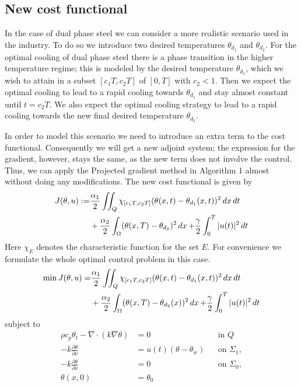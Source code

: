 \subsection{New cost functional}\label{sec:new-cost-func}

In the case of dual phase steel we can consider a more realistic scenario used in the industry. To do so we introduce two desired temperatures $\theta_{d_1}$ and $\theta_{d_2}$. For the optimal cooling of dual phase steel there is a phase transition in the higher temperature regime; this is modeled by the desired temperature $\theta_{d_1}$, which we wish to attain in a subset $[c_1T, c_2T]$ of $[0,T]$ with $c_2 < 1$. Then we expect the optimal cooling to lead to a rapid cooling towards $\theta_{d_1}$ and stay almost constant until $t=c_2T$. We also expect the optimal cooling strategy to lead to a rapid cooling towards the new final desired temperature $\theta_{d_2}$.

In order to model this scenario we need to introduce an extra term to the cost functional. Consequently we will get a new adjoint system; the expression for the gradient, however, stays the same, as the new term does not involve the control. Thus, we can apply the Projected gradient method in Algorithm 1 almost without doing any modifications. The new cost functional is given by 
\begin{equation}
\begin{aligned}
    \label{eq:new_cost}
    J(\theta,u) : =& \frac{\alpha_1}{2}\iint_{Q}\chi_{[c_1T,c_2T]}(\theta(x,t) - \theta_{d_1}(x,t))^2 \mathop{dx}\mathop{dt} \\
    &+ \frac{\alpha_2}{2}\int_{\Omega} (\theta(x,T) - \theta_{d_2})^2 \mathop{dx} + \frac{\gamma}{2}\int_0^T|u(t)|^2\mathop{dt}
\end{aligned}
\end{equation}
Here $\chi_E$ denotes the characteristic function for the set $E$. For convenience we formulate the whole optimal control problem in this case. 
\begin{equation*}
\begin{aligned}
   \min J(\theta, u) =& \frac{\alpha_1}{2}\iint_{Q}\chi_{[c_1T,c_2T]}(\theta(x,t) - \theta_{d_1}(x,t))^2 \mathop{dx}\mathop{dt} \\
   &+ \frac{\alpha_2}{2} \int_\Omega (\theta(x, T) - \theta_{d_2}(x))^2 \mathop{dx} + \frac{\gamma}{2} \int_0^{T} |u(t)|^2 \mathop{dt} 
\end{aligned}
\end{equation*}
subject to
\begin{align*}
       \rho c_p \theta_t - \nabla \cdot (k \nabla \theta) &= 0  &&\text{in } Q  \\
      -k \frac{\partial \theta}{\partial \nu} &= u(t) (\theta - \theta_w)  &&\text{on } \Sigma_1, \\
      -k \frac{\partial \theta}{\partial \nu} &= 0  &&\text{on } \Sigma_0, \\
      \theta(x, 0) &= \theta_0 
\end{align*}

